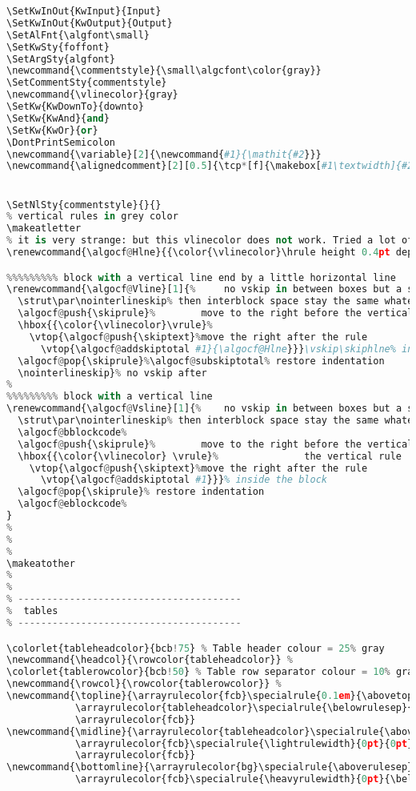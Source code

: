 {\begin{lstlisting}[language=Python,style=normal,escapechar=?,morekeywords={True, False}, mathescape]
\SetKwInOut{KwInput}{Input}
\SetKwInOut{KwOutput}{Output}
\SetAlFnt{\algfont\small}
\SetKwSty{foffont}
\SetArgSty{algfont}
\newcommand{\commentstyle}{\small\algcfont\color{gray}}
\SetCommentSty{commentstyle}
\newcommand{\vlinecolor}{gray}
\SetKw{KwDownTo}{downto}
\SetKw{KwAnd}{and}
\SetKw{KwOr}{or}
\DontPrintSemicolon
\newcommand{\variable}[2]{\newcommand{#1}{\mathit{#2}}}
\newcommand{\alignedcomment}[2][0.5]{\tcp*[f]{\makebox[#1\textwidth]{#2\hfill}}}


\SetNlSty{commentstyle}{}{}
% vertical rules in grey color
\makeatletter
% it is very strange: but this vlinecolor does not work. Tried a lot of different attempts. Leave it for the time being...
\renewcommand{\algocf@Hlne}{{\color{\vlinecolor}\hrule height 0.4pt depth 0pt width .5em}}%

%%%%%%%%% block with a vertical line end by a little horizontal line
\renewcommand{\algocf@Vline}[1]{%     no vskip in between boxes but a strut to separate them,
  \strut\par\nointerlineskip% then interblock space stay the same whatever is inside it
  \algocf@push{\skiprule}%        move to the right before the vertical rule
  \hbox{{\color{\vlinecolor}\vrule}%
    \vtop{\algocf@push{\skiptext}%move the right after the rule
      \vtop{\algocf@addskiptotal #1}{\algocf@Hlne}}}\vskip\skiphlne% inside the block
  \algocf@pop{\skiprule}%\algocf@subskiptotal% restore indentation
  \nointerlineskip}% no vskip after
%
%%%%%%%%% block with a vertical line
\renewcommand{\algocf@Vsline}[1]{%    no vskip in between boxes but a strut to separate them,
  \strut\par\nointerlineskip% then interblock space stay the same whatever is inside it
  \algocf@bblockcode%
  \algocf@push{\skiprule}%        move to the right before the vertical rule
  \hbox{{\color{\vlinecolor} \vrule}%               the vertical rule
    \vtop{\algocf@push{\skiptext}%move the right after the rule
      \vtop{\algocf@addskiptotal #1}}}% inside the block
  \algocf@pop{\skiprule}% restore indentation
  \algocf@eblockcode%
}
%
%
%
\makeatother
%
%
% ---------------------------------------
%  tables
% ---------------------------------------

\colorlet{tableheadcolor}{bcb!75} % Table header colour = 25% gray
\newcommand{\headcol}{\rowcolor{tableheadcolor}} %
\colorlet{tablerowcolor}{bcb!50} % Table row separator colour = 10% gray
\newcommand{\rowcol}{\rowcolor{tablerowcolor}} %
\newcommand{\topline}{\arrayrulecolor{fcb}\specialrule{0.1em}{\abovetopsep}{0pt}%
            \arrayrulecolor{tableheadcolor}\specialrule{\belowrulesep}{0pt}{0pt}%
            \arrayrulecolor{fcb}}
\newcommand{\midline}{\arrayrulecolor{tableheadcolor}\specialrule{\aboverulesep}{0pt}{0pt}%
            \arrayrulecolor{fcb}\specialrule{\lightrulewidth}{0pt}{0pt}%
            \arrayrulecolor{fcb}}
\newcommand{\bottomline}{\arrayrulecolor{bg}\specialrule{\aboverulesep}{0pt}{0pt}%
            \arrayrulecolor{fcb}\specialrule{\heavyrulewidth}{0pt}{\belowbottomsep}}%


\end{lstlisting}}
